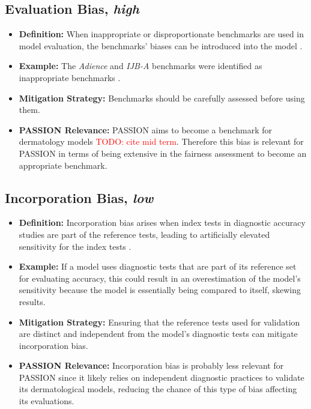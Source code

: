 \documentclass[12pt, a4paper, oneside]{book}   	%
\renewcommand{\todo}[1]{\textcolor{red}{TODO: #1}}
\begin{document}
\begin{appendices}
		\subsection{Evaluation Bias, \textit{high}}
		\begin{itemize}
			\item \textbf{Definition:} When inappropriate or disproportionate benchmarks are used in model evaluation, the benchmarks' biases can be introduced into the model \autocites{M144_Suresh_2021,M24_Buolamwini_2018}.
			\item \textbf{Example:} The \textit{Adience} and \textit{IJB-A} benchmarks were identified as inappropriate benchmarks \autocite{Mehrabi_2021}.
			\item \textbf{Mitigation Strategy:} Benchmarks should be carefully assessed before using them.
			\item \textbf{PASSION Relevance:} PASSION aims to become a benchmark for dermatology models \todo{cite mid term}. Therefore this bias is relevant for PASSION in terms of being extensive in the fairness assessment to become an appropriate benchmark.
		\end{itemize}
		
		\subsection{Incorporation Bias, \textit{low}}
		\begin{itemize}
			\item \textbf{Definition:} Incorporation bias arises when index tests in diagnostic accuracy studies are part of the reference tests, leading to artificially elevated sensitivity for the index tests \autocites{Chakraborty_2024, c21, c25, c26}.
			\item \textbf{Example:} If a model uses diagnostic tests that are part of its reference set for evaluating accuracy, this could result in an overestimation of the model's sensitivity because the model is essentially being compared to itself, skewing results.
			\item \textbf{Mitigation Strategy:} Ensuring that the reference tests used for validation are distinct and independent from the model's diagnostic tests can mitigate incorporation bias.
			\item \textbf{PASSION Relevance:} Incorporation bias is probably less relevant for PASSION since it likely relies on independent diagnostic practices to validate its dermatological models, reducing the chance of this type of bias affecting its evaluations.
		\end{itemize}
		

\end{appendices}
\end{document}
